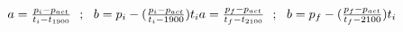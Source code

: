 \documentclass{article}
\begin{document}
\begin{math}
%
%
$$
a=\frac{p_i - p_{act}}{t_i - t_{1900}} \ \ ; \ \
b = p_i - (\frac{p_i - p_{act}}{t_i - 1900})t_i
$$
\\
\\
$$
a=\frac{p_f - p_{act}}{t_f - t_{2100}} \ \ ; \ \ 
b = p_f - (\frac{p_f - p_{act}}{t_f - 2100})t_i
$$
\\
\\
\end{math}
\end{document}
